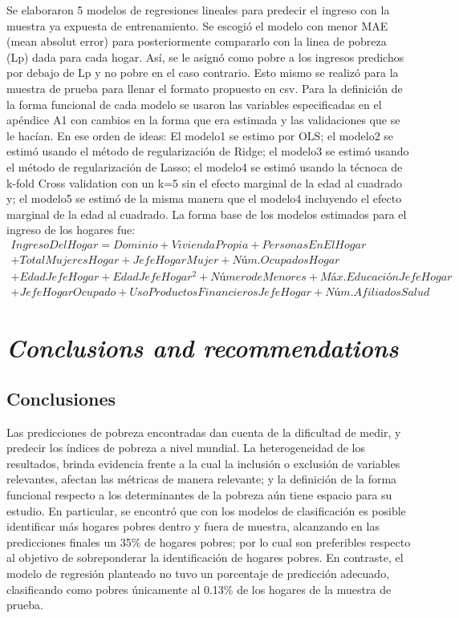 \documentclass[11pt]{article}
\begin{document}
 Se elaboraron 5 modelos de regresiones lineales para predecir el ingreso con la muestra ya expuesta de entrenamiento. Se escogió el modelo con menor MAE (mean absolut error) para posteriormente compararlo con la linea de pobreza (Lp) dada para cada hogar. Así, se le asignó como pobre a los ingresos predichos por debajo de Lp y no pobre en el caso contrario. Esto mismo se realizó para la muestra de prueba para llenar el formato propuesto en csv.
 \justify
 Para la definición de la forma funcional de cada modelo se usaron las variables especificadas en el apéndice A1 con cambios en la forma que era estimada y las validaciones que se le hacían.
  \justify
  En ese orden de ideas: El modelo1 se estimo por OLS; el modelo2 se estimó usando el método de regularización de Ridge; el modelo3 se estimó usando el método de regularización de Lasso; el modelo4 se estimó usando la técnoca de k-fold Cross validation con un k=5 sin el efecto marginal de la edad al cuadrado y; el modelo5 se estimó de la misma manera que el modelo4 incluyendo el efecto marginal de la edad al cuadrado.
 \justify
 La forma base de los modelos estimados para el ingreso de los hogares fue:
\begin{equation} \begin{split}
IngresoDelHogar = Dominio + ViviendaPropia + PersonasEnElHogar\\
+ Total Mujeres Hogar + Jefe Hogar Mujer + Núm. Ocupados Hogar \\
+Edad Jefe Hogar+ Edad Jefe Hogar^2 + Número de Menores + Máx. Educación Jefe Hogar\\
+ Jefe Hogar Ocupado + Uso Productos Financieros Jefe Hogar + Núm. Afiliados Salud
\label{eqn:kfold} \end{split} \end{equation}



\section{\bf\emph {Conclusions and recommendations}}
\subsection{Conclusiones}
  \justify
Las predicciones de pobreza encontradas dan cuenta de la dificultad de medir, y predecir los índices de pobreza a nivel mundial. La heterogeneidad de los resultados, brinda evidencia frente a la cual la inclusión o exclusión de variables relevantes, afectan las métricas de manera relevante; y la definición de la forma funcional respecto a los determinantes de la pobreza aún tiene espacio para su estudio. En particular, se encontró que con los modelos de clasificación es posible identificar más hogares pobres dentro y fuera de muestra, alcanzando en las predicciones finales un 35\% de hogares pobres; por lo cual son preferibles respecto al objetivo de sobreponderar la identificación de hogares pobres. En contraste, el modelo de regresión planteado no tuvo un porcentaje de predicción adecuado, clasificando como pobres únicamente al 0.13\% de los hogares de la muestra de prueba. 
\end{document}
